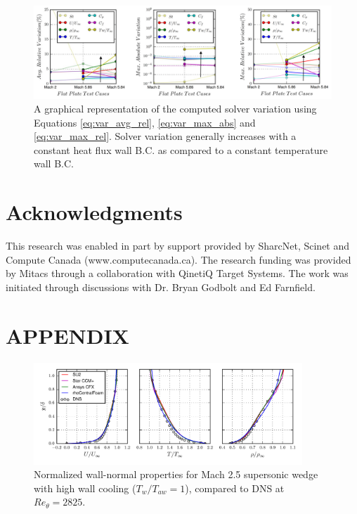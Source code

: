 \documentclass[journal ]{new-aiaa}
\begin{document}
\begin{figure}
\centering
    \includegraphics[width=\textwidth]{CHT/Avg_Rel_Variation.png}
  \caption{A graphical representation of the computed solver variation using Equations \eqref{eq:var_avg_rel}, \eqref{eq:var_max_abs} and \eqref{eq:var_max_rel}. Solver variation generally increases with a constant heat flux wall B.C. as compared to a constant temperature wall B.C.}
  \label{fig:numericalquantification}
\end{figure}

\section*{Acknowledgments}
This research was enabled in part by support provided by SharcNet, Scinet and Compute Canada (www.computecanada.ca). The research funding was provided by Mitacs through a collaboration with QinetiQ Target Systems. The work was initiated through discussions with Dr. Bryan Godbolt and Ed Farnfield.


\clearpage
\section*{APPENDIX}
\begin{figure}[h]
\centering
  \includegraphics[width=0.9\textwidth]{figs/Plate_RANS2_Comp_new.pdf}
  \caption{Normalized wall-normal properties for Mach 2.5 supersonic wedge with high wall cooling ($T_w/T_{aw} = 1$), compared to DNS at $Re_\theta = 2825$.}
  \label{fig:Plate_RANS2}
\end{figure}
\end{document}
